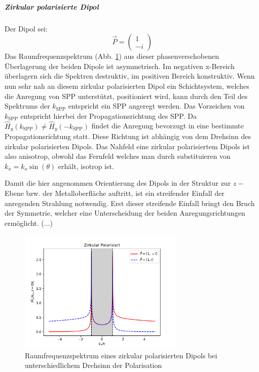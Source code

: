 \documentclass[titlepage]{article}
\begin{document}
		\subparagraph{Zirkular polarisierte Dipol}
			Der Dipol sei:
			$$\vec{P} = \begin{pmatrix} 1 \\ -i\end{pmatrix}$$
			Das Raumfrequenzspektrum (Abb. \ref{fig:spatial_spectrum_circ}) aus dieser phasenverschobenen Überlagerung der beiden Dipole ist asymmetrisch.  Im negativen x-Bereich überlagern sich die Spektren destruktiv, im positiven Bereich konstruktiv. Wenn nun sehr nah an diesem zirkular polarisierten Dipol ein Schichtsystem, welches die Anregung von SPP unterstützt, positioniert wird, kann durch den Teil des Spektrums der $k_{\mathrm{SPP}}$ entspricht ein SPP angeregt werden. Das Vorzeichen von $k_{\mathrm{SPP}}$ entspricht hierbei der Propagationsrichtung des SPP. Da $\hat{H}_y(k_{\mathrm{SPP}}) \neq \hat{H}_y( -k_{\mathrm{SPP}}) $ findet die Anregung bevorzugt in eine bestimmte Propagationsrichtung statt. Diese Richtung ist abhängig von dem Drehsinn des zirkular polarisierten Dipols.			
			Das Nahfeld eine zirkular polarisiertem Dipols ist also anisotrop, obwohl das Fernfeld welches man durch substituieren von $k_x = k_o \sin(\theta)$ erhält, isotrop ist.
			
			Damit die hier angenommen Orientierung des Dipols in der Struktur zur $z-$Ebene bzw. der Metalloberfläche auftritt, ist ein streifender Einfall der anregenden Strahlung notwendig. Erst dieser streifende Einfall bringt den Bruch der Symmetrie, welcher eine Unterscheidung der beiden Anregungsrichtungen ermöglicht. (...)
		\begin{figure}[h]
			\centering
			\includegraphics[width=0.7\textwidth]{figures/spatial_spectrum_circ.pdf}
			\caption{Raumfrequenzspektrum eines zirkular polarisierten Dipols bei unterschiedlichem Drehsinn der Polarisation}
			\label{fig:spatial_spectrum_circ}
		\end{figure}	
		
\end{document}
